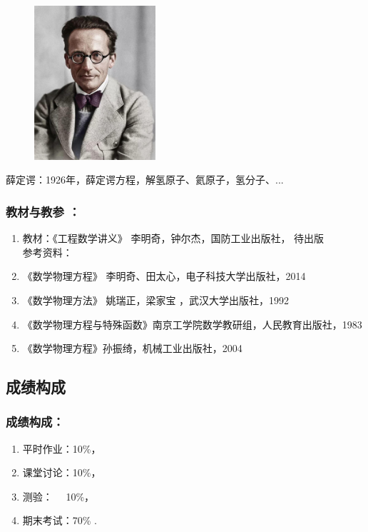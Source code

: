 \begin{frame}
	\frametitle{}
	\begin{center}
		\begin{figure}
			\includegraphics[width=4.5cm]{figs/fig1-3-9.png}	
		\end{figure}
	\end{center}
	{薛定谔：1926年，薛定谔方程，解氢原子、氦原子，氢分子、... }
\end{frame}
\begin{frame}
	\frametitle{教材与教参 ：}
	\begin{enumerate}
		\item 教材：《工程数学讲义》 李明奇，钟尔杰，国防工业出版社， 待出版\\	\vspace{0.3cm}
     	参考资料：\\
		\item 《数学物理方程》 李明奇、田太心，电子科技大学出版社，2014
		\vspace{0.3cm}
		\item 《数学物理方法》 姚瑞正，梁家宝 ，武汉大学出版社，1992
		\vspace{0.3cm}
		\item 《数学物理方程与特殊函数》南京工学院数学教研组，人民教育出版社，1983
		\vspace{0.3cm}
		\item 《数学物理方程》孙振绮，机械工业出版社，2004
	\end{enumerate}	
\end{frame}

\subsection{成绩构成}
\begin{frame}
	\frametitle{成绩构成：}
		\begin{enumerate}
		\item 平时作业：10\%，
		\vspace{0.8cm}
		\item 课堂讨论：10\%，
		\vspace{0.8cm}
		\item 测验：~~ 10\%，
		\vspace{0.8cm}
		\item 期末考试：70\% .
		\end{enumerate}	
\end{frame}

